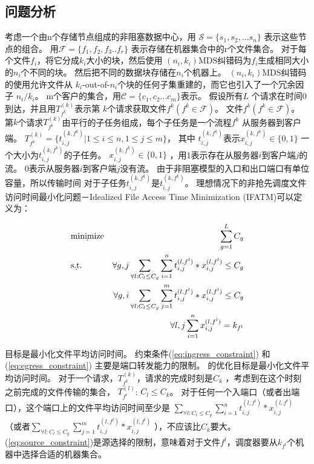 \subsection{问题分析}
考虑一个由n个存储节点组成的非阻塞数据中心，用
$\mathcal{S} = \{s_1,s_2,...s_n\}$ 表示这些节点的组合。
用$\mathcal{F}=\{f_1,f_2,f_3..f_r\}$ 表示存储在机器集合中的r个文件集合。
对于每个文件$f_i$，将它分成$k_i$大小的块，然后使用
$(n_i,k_i)$MDS纠错码为$f_i$生成相同大小的$n_i $个不同的块。
然后把不同的数据块存储在$n_i个$机器上。 
$(n_i, k_i)$MDS纠错码的使用允许文件从 $k_i$-out-of-$n_i$个块的任何子集重建的，而它也引入了一个冗余因子 $n_i / k_i$。 
m个客户的集合，用$\mathcal{C}=\{c_1,c_2...c_m\}$表示。
假设所有$L$ 个请求在时间0到达，并且用$T^{(k)}_{f^k}$表示第 $k$个请求获取文件$f^k(f^k\in \mathcal{F})$。
文件$f^k(f^k\in \mathcal{F})$。
第$k$个请求$T^{(k)}_{f^k} $由平行的子任务组成，每个子任务是一个流程$f^k$
从服务器到客户端。 $T^{(k)}_{f^k}=\{t_{i,j}^{(k,f^k)}|1 \le i \le n ,1\le j \le m\}$，
其中 $t_{i,j}^{(k,f^k)}$表示$x^{(k,f^k)}_{i,j}  \in \{0,1\}$
一个大小为$t_{i,j}^{(k,f^k)}$的子任务。
$x^{(k,f^k)}_{i,j}  \in \{0,1\}$ ，用1表示存在从服务器$i$到客户端$j$的流。
0表示从服务器$i$到客户端$j$没有流。
由于非阻塞模型的入口和出口端口有单位容量，所以传输时间
对于子任务$t_{i,j}^{(k,f^k)}$是$t_{i,j}^{(k,f^k)}$。
理想情况下的非抢先调度文件访问时间最小化问题－Idealized File Access Time Minimization (IFATM)可以定义为：


 \begin{eqnarray}
&\d {\rm minimize} & \sum_{g=1}^{L} C_{g} \label{eq:ECSF-SC} \\
& \d{\rm s.t.} &\forall g,j\sum_{\forall l:C_l \leq C_g}\sum_{i=1}^{n}t_{i,j}^{(l,f^l)}*x_{i,j}^{(l,f^l)}\leq C_g  \label{eq:ingress_constraint}\\
&&\forall g,i\sum_{\forall l:C_l \leq C_g}\sum_{j=1}^{m}t_{i,j}^{(l,f^l)}*x_{i,j} ^{(l,f^l)} \leq C_g   \label{eq:egress_constraint}\\
&& \forall l,j\sum_{i=1}^nx_{i,j}^{(l,f^l)}=k_{f^l}  \label{eq:source_constraint}
\end{eqnarray}

目标是最小化文件平均访问时间。
约束条件(\ref{eq:ingress_constraint}) 和(\ref{eq:egress_constraint}) 主要是端口转发能力的限制。
的优化目标是最小化文件平均访问时间。
对于一个请求，$T^{(k)}_{f^k}$，请求的完成时刻是$C_{k}$ ，考虑到在这个时刻之前完成的文件传输的集合， $T^{(l)}_{f^l}$: $C_{l} \le C_{k}$。
对于任何一个入端口（或者出端口），这个端口上的文件平均访问时间至少是 $\sum_{\forall l:C_l \leq C_g}\sum_{i=1}^{n}t_{i,j}^{(l,f^l)}*x_{i,j}^{(l,f^l)}$（或者$\sum_{\forall l:C_l \leq C_g}\sum_{j=1}^{m}t_{i,j}^{(l,f^l)}*x_{i,j} ^{(l,f^l)}$ ），不应该比$C_{k}$要大。
(\ref{eq:source_constraint})是源选择的限制，意味着对于文件${f^l}$，调度器要从$k_{f^l}$个机器中选择合适的机器集合。


